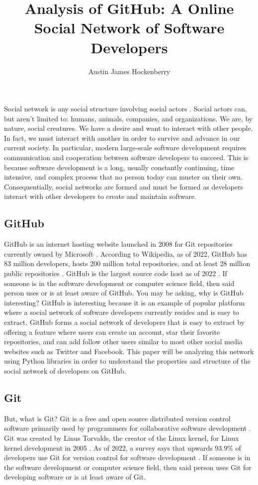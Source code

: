 \documentclass[9pt,twocolumn,twoside]{pnas-new}
\title{Analysis of GitHub: A Online Social Network of Software Developers}
\author[a,1]{Austin James Hockenberry}
\affil[a]{Undergraduate Student at the State University of New York at Buffalo}
\begin{document}
\maketitle
\thispagestyle{firststyle}

Social network is any social structure involving social actors \cite{wikipediasocialnetwork}.  Social actors can, but aren't limited to: humans, animals, companies, and organizations. We are, by nature, social creatures. We have a desire and want to interact with other people. In fact, we must interact with another in order to survive and advance in our current society. In particular, modern large-scale software development requires communication and cooperation between software developers to succeed. This is because software development is a long, usually constantly continuing, time intensive, and complex process that no person today can muster on their own. Consequentially, social networks are formed and must be formed as developers interact with other developers to create and maintain software.

\subsection*{GitHub} GitHub is an internet hosting website launched in 2008 for Git repositories currently owned by Microsoft \cite{wikipediagithub}. According to Wikipedia, as of 2022, GitHub has 83 million developers, hosts 200 million total repositories, and at least 28 million public repositories \cite{wikipediagithub}. GitHub is the largest source code host as of 2022 \cite{wikipediagithub}. If someone is in the software development or computer science field, then said person uses or is at least aware of GitHub. You may be asking, why is GitHub interesting? GitHub is interesting because it is an example of popular platform where a social network of software developers currently resides and is easy to extract. GitHub forms a social network of developers that is easy to extract by offering a feature where users can create an account, star their favorite repositories, and can add follow other users similar to most other social media websites such as Twitter and Facebook. This paper will be analyzing this network using Python libraries in order to understand the properties and structure of the social network of developers on GitHub.

\subsection*{Git} But, what is Git? Git is a free and open source distributed version control software primarily used by programmers for collaborative software development \cite{wikipediagit}. Git was created by Linus Torvalds, the creator of the Linux kernel, for Linux kernel development in 2005 \cite{wikipediagit}. As of 2022, a survey says that upwards 93.9\% of developers use Git for version control for software development \cite{wikipediagit}. If someone is in the software development or computer science field, then said person uses Git for developing software or is at least aware of Git.
\end{document}
